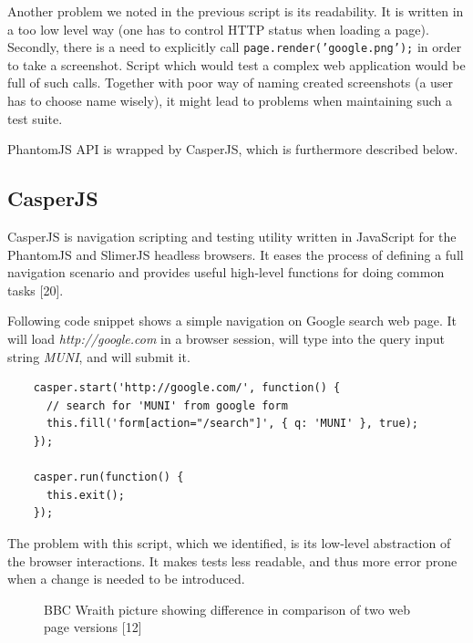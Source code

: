 \documentclass[11pt,oneside,final]{fithesis2}
\begin{document}
    Another problem we noted in the previous script is its readability. It is written in a too low level way (one has to control HTTP status when loading a page). Secondly, there is a need
    to explicitly call \texttt{page.render('google.png');} in order to take a screenshot. Script which would test a complex web application would be full of such calls. Together with poor
    way of naming created screenshots (a user has to choose name wisely), it might lead to problems when maintaining such a test suite.
    
    PhantomJS API is wrapped by CasperJS, which is furthermore described below.
    
    \subsection{CasperJS}
    \label{subsec:casperJS}
    CasperJS is navigation scripting and testing utility written in JavaScript for the PhantomJS and SlimerJS headless browsers. It eases the process of defining a full navigation scenario 
    and provides useful high-level functions for doing common tasks [20].
    
    Following code snippet shows a simple navigation on Google search web page. It will load \textit{http://google.com} in a browser session, 
    will type into the query input string \textit{MUNI}, and will submit it.
    
    \begin{verbatim}
    casper.start('http://google.com/', function() {
      // search for 'MUNI' from google form
      this.fill('form[action="/search"]', { q: 'MUNI' }, true);
    });
   
    casper.run(function() {
      this.exit();
    });
    \end{verbatim}
    
    The problem with this script, which we identified, is its low-level abstraction of the browser interactions. It makes tests less readable, and thus more error prone when a change
    is needed to be introduced.
    
    \begin{figure}[!htb]
    \begin{center}
    \leavevmode
    \centerline{}
    \end{center}
    \caption{BBC Wraith picture showing difference in comparison of two web page versions [12]}
    \label{fig:bbcWraithDiff} 
  \end{figure}
\end{document}
